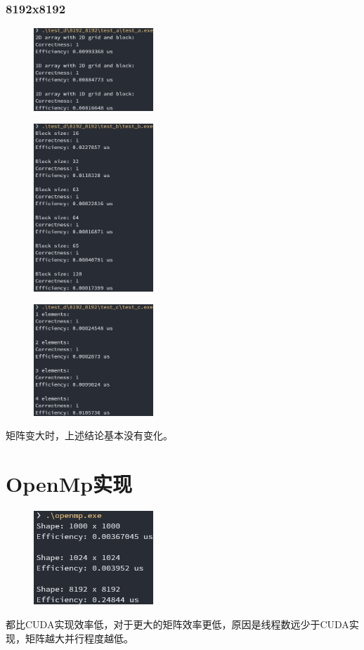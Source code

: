 \documentclass[UTF8, a4paper, 11pt]{article}
\begin{document}
\subsubsection{8192x8192}
\begin{figure}[H]
    \centering
    \includegraphics[width=0.4\textwidth]{8192_a.png}
\end{figure}
\begin{figure}[H]
    \centering
    \includegraphics[width=0.4\textwidth]{8192_b.png}
\end{figure}
\begin{figure}[H]
    \centering
    \includegraphics[width=0.4\textwidth]{8192_c.png}
\end{figure}
矩阵变大时，上述结论基本没有变化。
\section{OpenMp实现}
\begin{figure}[H]
    \centering
    \includegraphics[width=0.4\textwidth]{openmp.png}
\end{figure}
都比CUDA实现效率低，对于更大的矩阵效率更低，原因是线程数远少于CUDA实现，矩阵越大并行程度越低。
%
%
\end{document}
